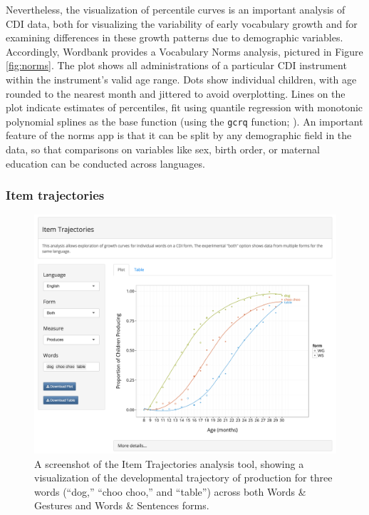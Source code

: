 \documentclass[doc,noapacite]{apa2}
\begin{document}
Nevertheless, the visualization of percentile curves is an important analysis of CDI data, both for visualizing the variability of early vocabulary growth and for examining differences in these growth patterns due to demographic variables. Accordingly, Wordbank provides a Vocabulary Norms analysis, pictured in Figure \ref{fig:norms}. The plot shows all administrations of a particular CDI instrument within the instrument's valid age range. Dots show individual children, with age rounded to the nearest month and jittered to avoid overplotting. Lines on the plot indicate estimates of percentiles, fit using quantile regression with monotonic polynomial splines as the base function (using the \texttt{gcrq} function; \cite{muggeo2013}). An important feature of the norms app is that it can be split by any demographic field in the data, so that comparisons on variables like sex, birth order, or maternal education can be conducted across languages. 

\subsubsection{Item trajectories}

\begin{figure}[h!]
\includegraphics[width=6.5in]{figures/itemsapp.png}
\caption{\label{fig:items} A screenshot of the Item Trajectories analysis tool, showing a visualization of the developmental trajectory of production for three words (``dog,'' ``choo choo,'' and ``table'') across both Words \& Gestures and Words \& Sentences forms.}
\end{figure}
\end{document}
